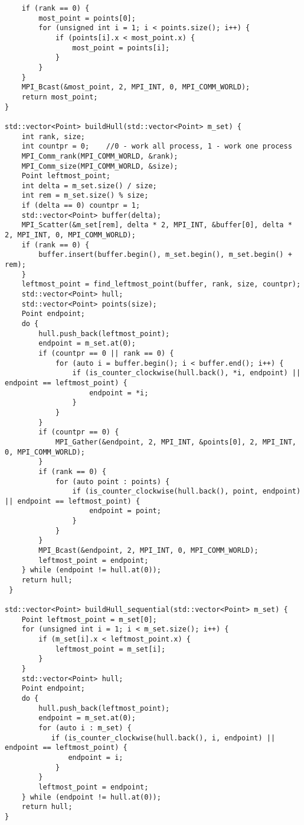 \documentclass{report}
\begin{document}
\begin{lstlisting}
    if (rank == 0) {
        most_point = points[0];
        for (unsigned int i = 1; i < points.size(); i++) {
            if (points[i].x < most_point.x) {
                most_point = points[i];
            }
        }
    }
    MPI_Bcast(&most_point, 2, MPI_INT, 0, MPI_COMM_WORLD);
    return most_point;
}

std::vector<Point> buildHull(std::vector<Point> m_set) {
    int rank, size;
    int countpr = 0;    //0 - work all process, 1 - work one process
    MPI_Comm_rank(MPI_COMM_WORLD, &rank);
    MPI_Comm_size(MPI_COMM_WORLD, &size);
    Point leftmost_point;
    int delta = m_set.size() / size;
    int rem = m_set.size() % size;
    if (delta == 0) countpr = 1;
    std::vector<Point> buffer(delta);
    MPI_Scatter(&m_set[rem], delta * 2, MPI_INT, &buffer[0], delta * 2, MPI_INT, 0, MPI_COMM_WORLD);
    if (rank == 0) {
        buffer.insert(buffer.begin(), m_set.begin(), m_set.begin() + rem);
    }
    leftmost_point = find_leftmost_point(buffer, rank, size, countpr);
    std::vector<Point> hull;
    std::vector<Point> points(size);
    Point endpoint;
    do {
        hull.push_back(leftmost_point);
        endpoint = m_set.at(0);
        if (countpr == 0 || rank == 0) {
            for (auto i = buffer.begin(); i < buffer.end(); i++) {
                if (is_counter_clockwise(hull.back(), *i, endpoint) || endpoint == leftmost_point) {
                    endpoint = *i;
                }
            }
        }
        if (countpr == 0) {
            MPI_Gather(&endpoint, 2, MPI_INT, &points[0], 2, MPI_INT, 0, MPI_COMM_WORLD);
        }
        if (rank == 0) {
            for (auto point : points) {
                if (is_counter_clockwise(hull.back(), point, endpoint) || endpoint == leftmost_point) {
                    endpoint = point;
                }
            }
        }
        MPI_Bcast(&endpoint, 2, MPI_INT, 0, MPI_COMM_WORLD);
        leftmost_point = endpoint;
    } while (endpoint != hull.at(0));
    return hull;
 }

std::vector<Point> buildHull_sequential(std::vector<Point> m_set) {
    Point leftmost_point = m_set[0];
    for (unsigned int i = 1; i < m_set.size(); i++) {
        if (m_set[i].x < leftmost_point.x) {
            leftmost_point = m_set[i];
        }
    }
    std::vector<Point> hull;
    Point endpoint;
    do {
        hull.push_back(leftmost_point);
        endpoint = m_set.at(0);
        for (auto i : m_set) {
           if (is_counter_clockwise(hull.back(), i, endpoint) || endpoint == leftmost_point) {
               endpoint = i;
            }
        }
        leftmost_point = endpoint;
    } while (endpoint != hull.at(0));
    return hull;
}


\end{lstlisting}
\end{document}
